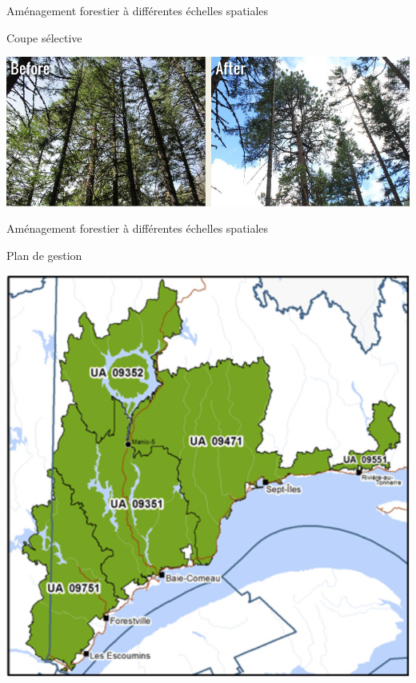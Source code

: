 \documentclass[11pt, compress, aspectratio=1610]{beamer}
\begin{document}
\begin{frame}{Aménagement forestier à différentes échelles spatiales}
\protect\hypertarget{amuxe9nagement-forestier-uxe0-diffuxe9rentes-uxe9chelles-spatiales}{}

Coupe sélective

\centering

\includegraphics[scale=0.338]{figures/thinning}

\par

\end{frame}

\begin{frame}{Aménagement forestier à différentes échelles spatiales}
\protect\hypertarget{amuxe9nagement-forestier-uxe0-diffuxe9rentes-uxe9chelles-spatiales-1}{}

\vspace*{-7mm}

Plan de gestion

\centering

\includegraphics[scale=0.28]{figures/planGestion}

\par

\end{frame}
\end{document}
